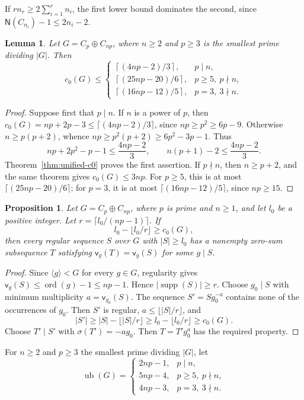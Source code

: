 \documentclass[10pt,a4paper]{amsart}
\newtheorem{lem}[thm]{Lemma}
\newtheorem{prop}[thm]{Proposition}
\theoremstyle{definition}
\theoremstyle{remark}
\numberwithin{equation}{section}
\DeclareMathOperator{\ord}{ord}
\DeclareMathOperator{\supp}{supp}
\begin{document}
If $rn_r\ge2\sum_{i=1}^r n_i$, the first lower bound dominates the second,
since $\mathsf{N}(C_{n_i})-1\le2n_i-2$.

\begin{lem}\label{lem6.1}
Let $G=C_p\oplus C_{np}$, where $n\ge2$ and $p\ge3$ is the
smallest prime dividing $|G|$. Then
\[
c_0(G)\le
\begin{cases}
\left\lceil(4np-2)/3\right\rceil,&p\mid n,\\
\left\lceil(25np-20)/6\right\rceil,&p\ge5,\ p\nmid n,\\
\left\lceil(16np-12)/5\right\rceil,&p=3,\ 3\nmid n.
\end{cases}
\]
\end{lem}

\begin{proof}
Suppose first that $p\mid n$.
If $n$ is a power of $p$, then
$c_0(G)=np+2p-3\le\lceil(4np-2)/3\rceil$, since
$np\ge p^2\ge6p-9$.
Otherwise $n\ge p(p+2)$, whence
$np\ge p^2(p+2)\ge6p^2-3p-1$. Thus
\[
np+2p^2-p-1\le\frac{4np-2}{3},
\qquad
n(p+1)-2\le\frac{4np-2}{3}.
\]
Theorem~\ref{thm:unified-c0} proves the first assertion.
If $p\nmid n$, then $n\ge p+2$, and the same theorem gives
$c_0(G)\le3np$.
For $p\ge5$, this is at most $\lceil(25np-20)/6\rceil$;
for $p=3$, it is at most $\lceil(16np-12)/5\rceil$,
since $np\ge15$.
\end{proof}

\begin{prop}\label{prop:regular-N-reduction}
Let $G=C_p\oplus C_{np}$, where $p$ is prime and $n\ge1$, and let $l_0$ be a positive integer.
Let $r=\lceil l_0/(np-1)\rceil$. If
\[
l_0-\lfloor l_0/r\rfloor\ge c_0(G),
\]
then every regular sequence $S$ over $G$ with $|S|\ge l_0$
has a nonempty zero-sum subsequence $T$ satisfying
$\mathsf v_g(T)=\mathsf v_g(S)$ for some $g\mid S$.
\end{prop}

\begin{proof}
Since $\langle g\rangle<G$ for every $g\in G$,
regularity gives $\mathsf v_g(S)\le\ord(g)-1\le np-1$.
Hence $|\supp(S)|\ge r$.
Choose $g_0\mid S$ with minimum multiplicity
$a=\mathsf v_{g_0}(S)$. The sequence $S'=Sg_0^{-a}$
contains none of the occurrences of $g_0$.
Then $S'$ is regular, $a\le\lfloor |S|/r\rfloor$, and
\[
|S'|\ge |S|-\lfloor |S|/r\rfloor
\ge l_0-\lfloor l_0/r\rfloor\ge c_0(G).
\]
Choose $T'\mid S'$ with $\sigma(T')=-ag_0$.
Then $T=T'g_0^a$ has the required property.
\end{proof}

For $n\ge2$ and $p\ge3$ the smallest prime dividing $|G|$, let
\[
\operatorname{ub}(G)=\begin{cases}
2np-1,&p\mid n,\\
5np-4,&p\ge5,\ p\nmid n,\\
4np-3,&p=3,\ 3\nmid n.
\end{cases}
\]
\end{document}

